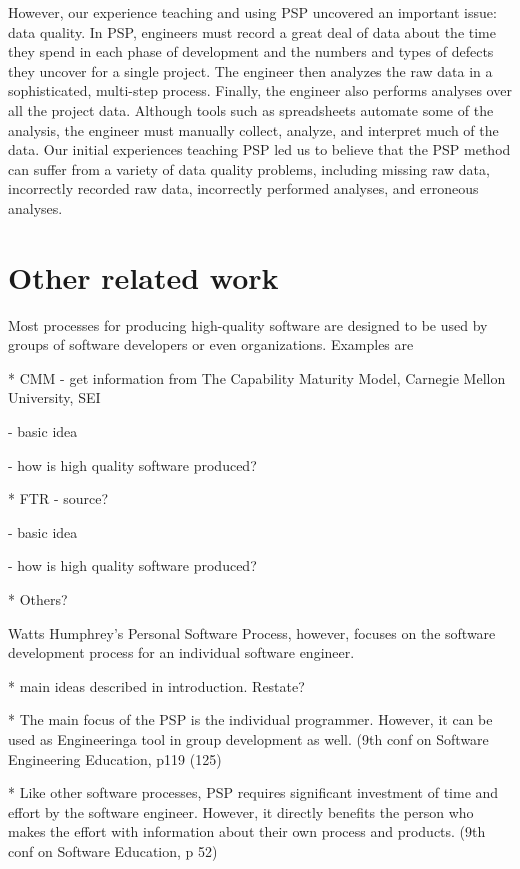 However, our experience teaching and using PSP uncovered an
important issue:  data quality.  In PSP, engineers must record
a great deal of data about the time they spend in each phase
of development and the numbers and types of defects they uncover
for a single project.  The engineer then analyzes the raw data in
a sophisticated, multi-step process.  Finally, the engineer also
performs analyses over all the project data.  Although tools such
as spreadsheets automate some of the analysis, the engineer must
manually collect, analyze, and interpret much of the data.  Our
initial experiences teaching PSP led us to believe that the PSP
method can suffer from a variety of data quality problems, including
missing raw data, incorrectly recorded raw data, incorrectly performed
analyses, and erroneous analyses.

\chapter{Other related work}

Most processes for producing high-quality software are designed to be 
used by groups of
software developers or even organizations.  Examples are

* CMM - get information from The Capability Maturity Model, Carnegie 
Mellon University, SEI

  - basic idea

  - how is high quality software produced?

* FTR  - source?

  - basic idea

  - how is high quality software produced?

* Others?


Watts Humphrey's Personal Software Process, however, focuses on the 
software development
process for an individual software engineer.

* main ideas described in introduction.  Restate?

* The main focus of the PSP is the individual programmer.  However, it 
can be used as
Engineeringa tool in group development as well.  (9th conf on Software 
Engineering Education, p119 (125)

* Like other software processes, PSP requires significant investment of 
time and effort by the
  software engineer.  However, it directly benefits the person who makes 
the effort with
  information about their own process and products. (9th conf on 
Software  Education,  
  p 52)


